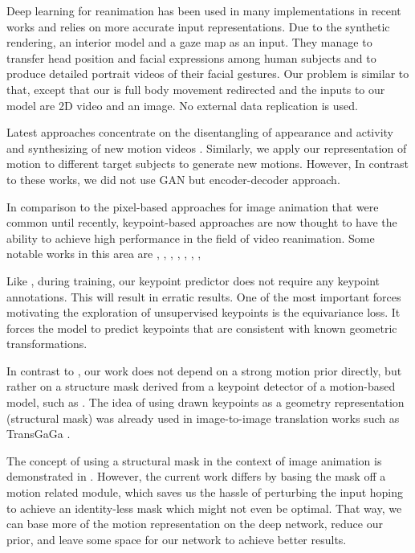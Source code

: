 \documentclass{article}
\begin{document}
Deep learning for reanimation has been used in many implementations in
recent works and relies on more accurate input representations. Due to the
synthetic rendering, an interior model and a gaze map as an input. They
manage to transfer head position and facial expressions among human subjects
and to produce detailed portrait videos of their facial
gestures\cite{kim2018deep}. Our problem is similar to that, except that our
is full body movement  redirected and the inputs to our model are 2D video
and an image. No external data replication is used.

Latest approaches concentrate on the disentangling of appearance and
activity and synthesizing of new motion videos \cite{tulyakov2018mocogan}.
Similarly, we apply our representation of motion to different target
subjects to generate new motions. However, In contrast to these works, we did not use GAN but encoder-decoder approach.

In comparison to the pixel-based approaches for image animation that were common until recently,
keypoint-based approaches are now thought to have the ability to achieve
high performance in the field of video reanimation. Some notable works in
this area are \cite{siarohin2020order}, \cite{wiles2018x2face},
\cite{siarohin2019animating}, \cite{kim2019unsupervised},
\cite{balakrishnan2018synthesizing}, \cite{ma2017pose},
\cite{reed2017parallel}, \cite{chan2019everybody}

Like \cite{siarohin2020order}, during training, our keypoint predictor does not require any keypoint annotations. This will result in erratic results. One of the most important forces motivating the exploration of unsupervised keypoints is the equivariance loss. It forces the model to predict keypoints that are consistent with known geometric transformations.

In contrast to \cite{siarohin2020order}, our work does not depend on a strong
motion prior directly, but rather on a
structure mask derived from a keypoint detector of a motion-based model,
such as \cite{siarohin2020order}. The idea of using drawn keypoints as a
geometry representation (structural mask) was already used in image-to-image
translation works such as TransGaGa \cite{wu2019transgaga}.

The concept of using a structural mask in the context of image animation is
demonstrated in \cite{shalev2020image}. However, the current work differs
by basing the mask off a motion related module, which saves us the hassle
of perturbing the input hoping to achieve an identity-less mask which might
not even be optimal. That way, we
can base more of the motion representation on the deep network, reduce our
prior, and leave some space for our network to achieve better results.
\end{document}
